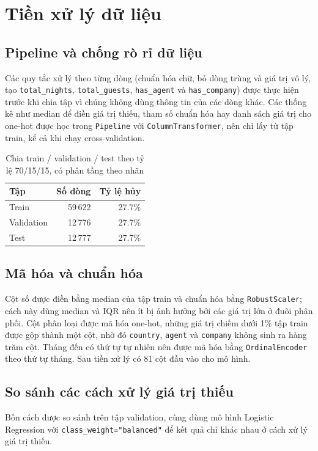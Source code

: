 \section{Tiền xử lý dữ liệu}

\subsection{Pipeline và chống rò rỉ dữ liệu}
Các quy tắc xử lý theo từng dòng (chuẩn hóa chữ, bỏ dòng trùng và giá trị vô lý, tạo \texttt{total\_nights},
\texttt{total\_guests}, \texttt{has\_agent} và \texttt{has\_company}) được thực hiện trước khi chia tập vì chúng không dùng
thông tin của các dòng khác. Các thống kê như median để điền giá trị thiếu, tham số chuẩn hóa hay danh sách giá trị cho one-hot
được học trong \texttt{Pipeline} với \texttt{ColumnTransformer}, nên chỉ lấy từ tập train, kể cả khi chạy cross-validation.

\begin{table}[H]
\centering
\caption{Chia train / validation / test theo tỷ lệ 70/15/15, có phân tầng theo nhãn}
\label{tab:tab-split}
\begin{tabular}{lrr}
\toprule
Tập & Số dòng & Tỷ lệ hủy\\
\midrule
Train & 59\,622 & 27.7\%\\
Validation & 12\,776 & 27.7\%\\
Test & 12\,777 & 27.7\%\\
\bottomrule
\end{tabular}
\end{table}

\subsection{Mã hóa và chuẩn hóa}
Cột số được điền bằng median của tập train và chuẩn hóa bằng \texttt{RobustScaler}; cách này dùng median và IQR nên ít bị ảnh hưởng
bởi các giá trị lớn ở đuôi phân phối. Cột phân loại được mã hóa one-hot, những giá trị chiếm dưới 1\% tập train được gộp thành một cột,
nhờ đó \texttt{country}, \texttt{agent} và \texttt{company} không sinh ra hàng trăm cột. Tháng đến có thứ tự tự nhiên nên được mã hóa
bằng \texttt{OrdinalEncoder} theo thứ tự tháng. Sau tiền xử lý có 81 cột đầu vào cho mô hình.

\subsection{So sánh các cách xử lý giá trị thiếu}
Bốn cách được so sánh trên tập validation, cùng dùng mô hình Logistic Regression với \texttt{class\_weight="balanced"} để kết quả chỉ khác nhau ở cách xử lý giá trị thiếu.

